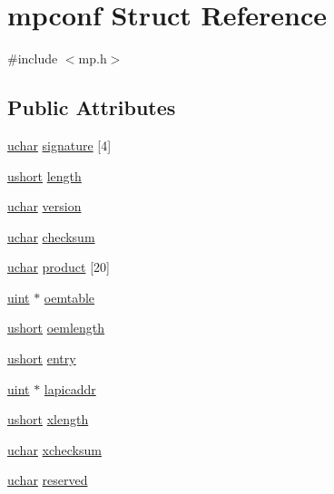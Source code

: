 \hypertarget{structmpconf}{}\section{mpconf Struct Reference}
\label{structmpconf}


{\ttfamily \#include $<$mp.\+h$>$}

\subsection*{Public Attributes}
\begin{DoxyCompactItemize}
\item 
\hyperlink{types_8h_a65f85814a8290f9797005d3b28e7e5fc}{uchar} \hyperlink{structmpconf_a7bf26b6b2b09d4265ffcbdb362bc5c8b}{signature} \mbox{[}4\mbox{]}
\item 
\hyperlink{types_8h_ab95f123a6c9bcfee6a343170ef8c5f69}{ushort} \hyperlink{structmpconf_a6b7583180c78b6a2e490d6c72779d8dd}{length}
\item 
\hyperlink{types_8h_a65f85814a8290f9797005d3b28e7e5fc}{uchar} \hyperlink{structmpconf_ade1055584605c76f4e1134d6631e0afa}{version}
\item 
\hyperlink{types_8h_a65f85814a8290f9797005d3b28e7e5fc}{uchar} \hyperlink{structmpconf_aac54c4c7710b90574416a945cdcd3b9e}{checksum}
\item 
\hyperlink{types_8h_a65f85814a8290f9797005d3b28e7e5fc}{uchar} \hyperlink{structmpconf_ac4e4d4d150aac8ea0bba92ff2cfae557}{product} \mbox{[}20\mbox{]}
\item 
\hyperlink{types_8h_a91ad9478d81a7aaf2593e8d9c3d06a14}{uint} $\ast$ \hyperlink{structmpconf_a1b3e44d3639e8f3117e6bca9626d680b}{oemtable}
\item 
\hyperlink{types_8h_ab95f123a6c9bcfee6a343170ef8c5f69}{ushort} \hyperlink{structmpconf_a5aaf9c7afa2f1be645b8e633f6ff43a1}{oemlength}
\item 
\hyperlink{types_8h_ab95f123a6c9bcfee6a343170ef8c5f69}{ushort} \hyperlink{structmpconf_a75f67295a180d1f72b93be82e09ecc2a}{entry}
\item 
\hyperlink{types_8h_a91ad9478d81a7aaf2593e8d9c3d06a14}{uint} $\ast$ \hyperlink{structmpconf_a087fac7e9dc4ca1fdfe142b3adf96c99}{lapicaddr}
\item 
\hyperlink{types_8h_ab95f123a6c9bcfee6a343170ef8c5f69}{ushort} \hyperlink{structmpconf_adbda8ec5a43970662e7eab8f8da11817}{xlength}
\item 
\hyperlink{types_8h_a65f85814a8290f9797005d3b28e7e5fc}{uchar} \hyperlink{structmpconf_a499447fb50cb158a848f66f124dd8f8d}{xchecksum}
\item 
\hyperlink{types_8h_a65f85814a8290f9797005d3b28e7e5fc}{uchar} \hyperlink{structmpconf_ab7ce4c5b90a538f41baefef6714d1a23}{reserved}
\end{DoxyCompactItemize}


